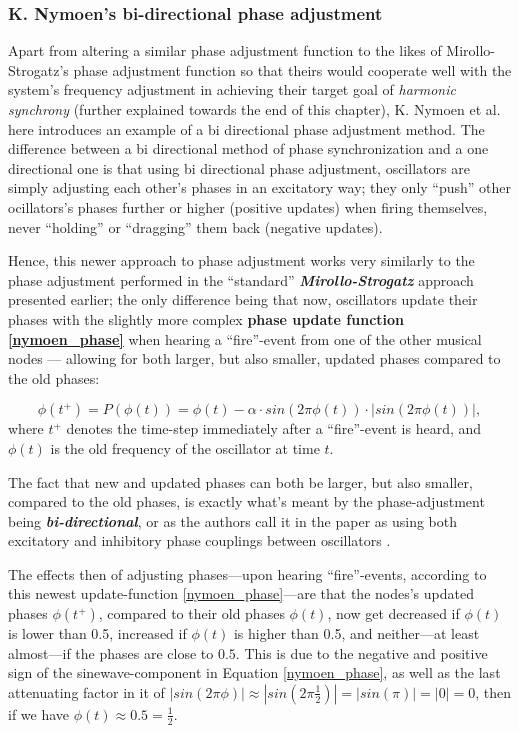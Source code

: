 		\subsubsection{K. Nymoen's bi-directional phase adjustment} %
		\label{subsec:nymoen_phase_adjust}

		Apart from altering a similar phase adjustment function to the likes of Mirollo-Strogatz's phase adjustment function so that theirs would cooperate well with the system's frequency adjustment in achieving their target goal of \textit{harmonic synchrony} (further explained towards the end of this chapter), K. Nymoen et al. \cite{nymoen_synch} here introduces an example of a bi directional phase adjustment method. The difference between a bi directional method of phase synchronization and a one directional one is that using bi directional phase adjustment, oscillators are simply adjusting each other's phases in an excitatory way; they only ``push'' other ocillators's phases further or higher (positive updates) when firing themselves, never ``holding'' or ``dragging'' them back (negative updates).

		Hence, this newer approach to phase adjustment works very similarly to the phase adjustment performed in the ``standard'' \textbf{\textit{Mirollo-Strogatz}} approach presented earlier; the only difference being that now, oscillators update their phases with the slightly more complex \textbf{phase update function \eqref{nymoen_phase}} when hearing a ``fire''-event from one of the other musical nodes — allowing for both larger, but also smaller, updated phases compared to the old phases:

		\begin{equation}
		\label{nymoen_phase}
			\phi(t^+)=P(\phi(t)) = \phi(t) - \alpha \cdot sin(2\pi\phi(t)) \cdot | sin(2\pi\phi(t)) | ,
		\end{equation} \nl
		where $t^+$ denotes the time-step immediately after a ``fire''-event is heard, and $\phi(t)$ is the old frequency of the oscillator at time $t$.

		The fact that new and updated phases can both be larger, but also smaller, compared to the old phases, is exactly what's meant by the phase-adjustment being \textbf{\textit{bi-directional}}, or as the authors call it in the paper as using both excitatory and inhibitory phase couplings between oscillators \cite{nymoen_synch}.

		The effects then of adjusting phases—upon hearing ``fire''-events, according to this newest update-function \eqref{nymoen_phase}—are that the nodes's updated phases $\phi(t^+)$, compared to their old phases $\phi(t)$, now get decreased if $\phi(t)$ is lower than 0.5, increased if $\phi(t)$ is higher than 0.5, and neither—at least almost—if the phases are close to $0.5$. This is due to the negative and positive sign of the sinewave-component in Equation \eqref{nymoen_phase}, as well as the last attenuating factor in it of $| sin(2\pi\phi) | \approx | sin(2\pi \frac{1}{2}) | = | sin(\pi) | = | 0 | = 0$, then if we have $\phi(t) \approx 0.5 = \frac{1}{2}$.

